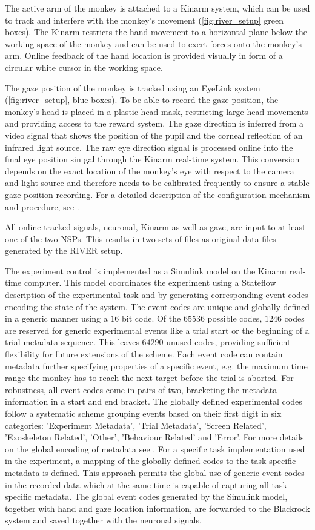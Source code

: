 The active arm of the monkey is attached to a Kinarm system, which can be used to track and interfere with the monkey's movement (\cref{fig:river_setup} green boxes). The Kinarm restricts the hand movement to a horizontal plane below the working space of the monkey and can be used to exert forces onto the monkey's arm. Online feedback of the hand location is provided visually in form of a circular white cursor in the working space.

The gaze position of the monkey is tracked using an EyeLink system (\cref{fig:river_setup}, blue boxes). To be able to record the gaze position, the monkey's head is placed in a plastic head mask, restricting large head movements and providing access to the reward system. The gaze direction is inferred from a video signal that shows the position of the pupil and the corneal reflection of an infrared light source. The raw eye direction signal is processed online into the final eye position sin gal through the Kinarm real-time system. This conversion depends on the exact location of the monkey's eye with respect to the camera and light source and therefore needs to be calibrated frequently to ensure a stable gaze position recording. For a detailed description of the configuration mechanism and procedure, see \citet{deHaan_2018}.

All online tracked signals, neuronal, Kinarm as well as gaze, are input to at least one of the  two NSPs. This results in two sets of  files as original data files generated by the RIVER setup.

The experiment control is implemented as a Simulink model on the Kinarm real-time computer. This model coordinates the experiment using a Stateflow description of the experimental task and by generating corresponding event codes encoding the state of the system. The event codes are unique and globally defined in a generic manner using a $16$ bit code. Of the $65536$ possible codes, $1246$ codes are reserved for generic experimental events like a trial start or the beginning of a trial metadata sequence. This leaves $64290$ unused codes, providing sufficient flexibility for future extensions of the scheme. Each event code can contain metadata further specifying properties of a specific event, e.g. the maximum time range the monkey has to reach the next target before the trial is aborted. For robustness, all event codes come in pairs of two, bracketing the metadata information in a start and end bracket. The globally defined experimental codes follow a systematic scheme grouping events based on their first digit in six categories: 'Experiment Metadata', 'Trial Metadata', 'Screen Related', 'Exoskeleton Related', 'Other', 'Behaviour Related' and 'Error'. For more details on the global encoding of metadata see \citet{deHaan_2018a}.
For a specific task implementation used in the experiment, a mapping of the globally defined codes to the task specific metadata is defined. This approach permits the global use of generic event codes in the recorded data which at the same time is capable of capturing all task specific metadata. The global event codes generated by the Simulink model, together with hand and gaze location information, are forwarded to the Blackrock system and saved together with the neuronal signals.

